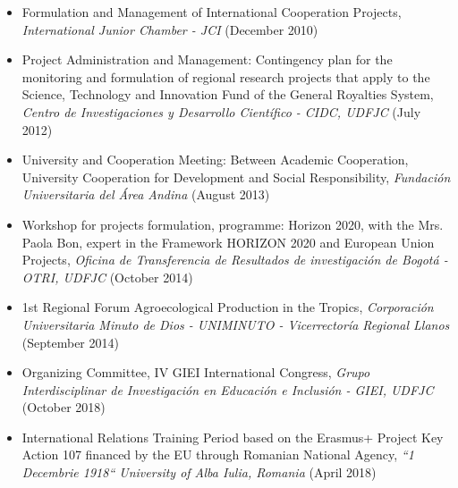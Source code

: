 \documentclass[overlapped,line,final]{res}
\begin{document}
\begin{resume}
\begin{itemize}
	\item Formulation and Management of International Cooperation Projects, \textit{International Junior Chamber - JCI} (December 2010)
	\item Project Administration and Management: Contingency plan for the monitoring and formulation of regional research projects that apply to the Science, Technology and Innovation Fund of the General Royalties System, \textit{Centro de Investigaciones y Desarrollo Científico - CIDC, UDFJC} (July 2012)
	\item University and Cooperation Meeting: Between Academic Cooperation, University Cooperation for Development and Social Responsibility, \textit{Fundación Universitaria del Área Andina} (August 2013)
	\item Workshop for projects formulation, programme: Horizon 2020, with the Mrs. Paola Bon, expert in the Framework HORIZON 2020 and European Union Projects, \textit{Oficina de Transferencia de Resultados de investigación de Bogotá - OTRI, UDFJC} (October 2014)
	\item 1st Regional Forum Agroecological Production in the Tropics, \textit{Corporación Universitaria Minuto de Dios - UNIMINUTO - Vicerrectoría Regional Llanos} (September 2014)
	\item Organizing Committee, IV GIEI International Congress, \textit{Grupo Interdisciplinar de Investigación en Educación e Inclusión - GIEI, UDFJC} (October 2018)
	\item International Relations Training Period based on the Erasmus+ Project Key Action 107 financed by the EU through Romanian National Agency, \textit{``1 Decembrie 1918`` University of Alba Iulia, Romania} (April 2018)
	\
\end{itemize}




\end{resume}
\end{document}

